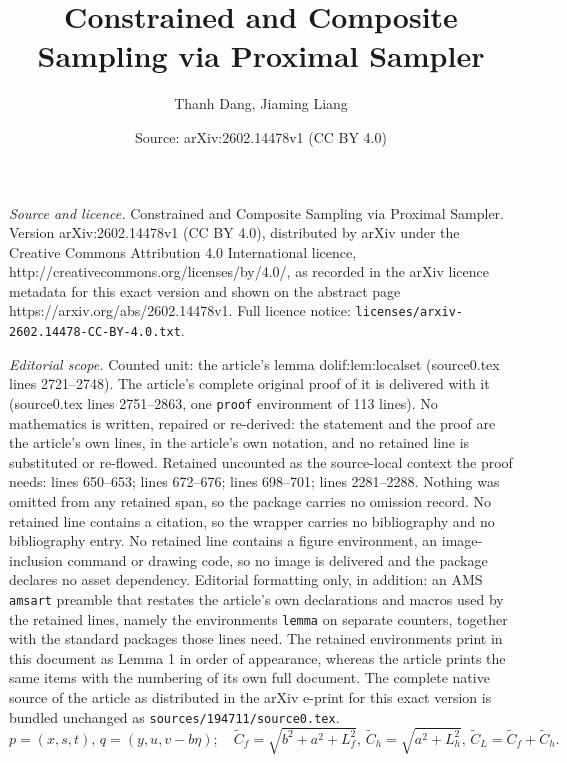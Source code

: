 \documentclass[10pt,a4paper]{amsart}
\title{Constrained and Composite Sampling via Proximal Sampler}
\author{Thanh Dang, Jiaming Liang}
\date{Source: arXiv:2602.14478v1 (CC BY 4.0)}
\begin{document}
\maketitle

\noindent\emph{Source and licence.} Constrained and Composite Sampling via Proximal Sampler. Version arXiv:2602.14478v1 (CC BY 4.0), distributed by arXiv under the Creative Commons Attribution 4.0 International licence, http://creativecommons.org/licenses/by/4.0/, as recorded in the arXiv licence metadata for this exact version and shown on the abstract page https://arxiv.org/abs/2602.14478v1. Full licence notice: \texttt{licenses/arxiv-2602.14478-CC-BY-4.0.txt}.\par\smallskip

\noindent\textit{Editorial scope.} Counted unit: the article's lemma dolif:lem:localset (source0.tex lines 2721--2748). The article's complete original proof of it is delivered with it (source0.tex lines 2751--2863, one \texttt{proof} environment of 113 lines). No mathematics is written, repaired or re-derived: the statement and the proof are the article's own lines, in the article's own notation, and no retained line is substituted or re-flowed.  Retained uncounted as the source-local context the proof needs: lines 650--653; lines 672--676; lines 698--701; lines 2281--2288.  Nothing was omitted from any retained span, so the package carries no omission record.  No retained line contains a citation, so the wrapper carries no bibliography and no bibliography entry.  No retained line contains a figure environment, an image-inclusion command or drawing code, so no image is delivered and the package declares no asset dependency.  Editorial formatting only, in addition: an AMS \texttt{amsart} preamble that restates the article's own declarations and macros used by the retained lines, namely the environments \texttt{lemma} on separate counters, together with the standard packages those lines need.  The retained environments print in this document as Lemma 1 in order of appearance, whereas the article prints the same items with the numbering of its own full document.  The complete native source of the article as distributed in the arXiv e-print for this exact version is bundled unchanged as \texttt{sources/194711/source0.tex}.
\begin{equation}
\label{dolif:def:notation}
    p=(x,s,t), \, q=(y,u,v-b\eta);\quad \widetilde{C}_f=\sqrt{b^2+a^2+L_f^2}, \, \widetilde{C}_h=\sqrt{a^2+L_h^2}, \, \widetilde{C}_L=\widetilde{C}_f+\widetilde{C}_h. 
\end{equation}
\end{document}
